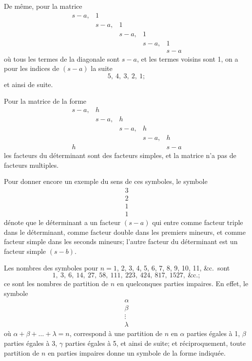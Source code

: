 \documentclass[11pt,a4paper]{book}
\begin{document}
De m\^{e}me, pour la matrice
\[
\begin{matrix}
s-a, & 1 & & & \\
& s-a, & 1 & & \\
& & s-a, & 1 & \\
& & & s-a, & 1 \\
& & & & s-a
\end{matrix}
\]
o\`{u} tous les termes de la diagonale sont $s-a$, et les termes voisins sont 1, on a pour les indices de $(s-a)$ la suite
\[
5,\ 4,\ 3,\ 2,\ 1;
\]
et ainsi de suite.

Pour la matrice de la forme
\[
\begin{matrix}
s-a, & h & & & \\
& s-a, & h & & \\
& & s-a, & h & \\
& & & s-a, & h \\
h & & & & s-a
\end{matrix}
\]
les facteurs du d\'{e}terminant sont des facteurs simples, et la matrice n'a pas de facteurs multiples.

\newpage
\setcounter{page}{219}

Pour donner encore un exemple du sens de ces symboles, le symbole
\[
\begin{array}{c}
3 \\
2 \\
1 \\
1
\end{array}
\]
d\'{e}note que le d\'{e}terminant a un facteur $(s-a)$ qui entre comme facteur triple dans le d\'{e}terminant, comme facteur double dans les premiers mineurs, et comme facteur simple dans les seconds mineurs; l'autre facteur du d\'{e}terminant est un facteur simple $(s-b)$.

Les nombres des symboles pour $n = 1$, 2, 3, 4, 5, 6, 7, 8, 9, 10, 11, \&c.\ sont
\[
1,\ 3,\ 6,\ 14,\ 27,\ 58,\ 111,\ 223,\ 424,\ 817,\ 1527,\ \text{\&c.};
\]
ce sont les nombres de partition de $n$ en quelconques parties impaires. En effet, le symbole
\[
\begin{array}{c}
\alpha \\
\beta \\
\vdots \\
\lambda
\end{array}
\]
o\`{u} $\alpha + \beta + \ldots + \lambda = n$, correspond \`{a} une partition de $n$ en $\alpha$ parties \'{e}gales \`{a} 1, $\beta$ parties \'{e}gales \`{a} 3, $\gamma$ parties \'{e}gales \`{a} 5, et ainsi de suite; et r\'{e}ciproquement, toute partition de $n$ en parties impaires donne un symbole de la forme indiqu\'{e}e.
\end{document}
